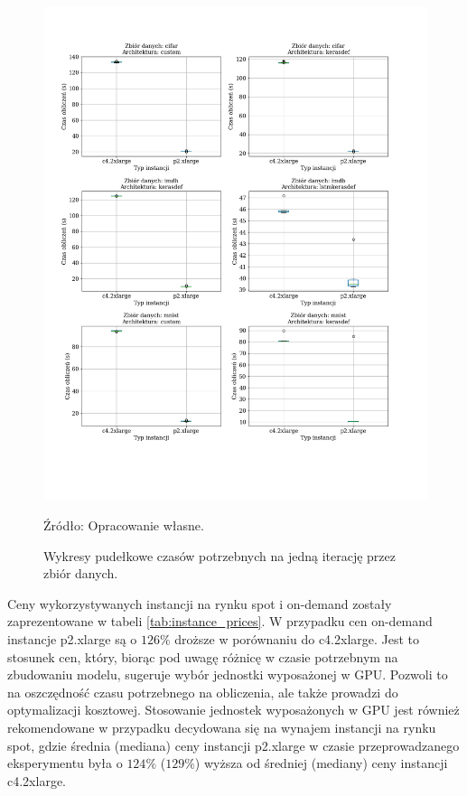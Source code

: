 \documentclass[12pt,a4paper,twoside]{article}
\newcommand{\source}[1]{\caption*{\hfill Źródło: {#1}} }
\begin{document}
\begin{figure}[h]
  \centering
\includegraphics[scale=0.5]{../obrazy/fig:experiment_results.png}
\caption{Wykresy pudełkowe czasów potrzebnych na jedną iterację przez zbiór danych.\label{fig:experiment_results}}
\source{Opracowanie własne.}
\end{figure}

Ceny wykorzystywanych instancji na rynku spot i on-demand zostały zaprezentowane w tabeli \ref{tab:instance_prices}. W przypadku cen on-demand instancje p2.xlarge są o $126\%$ droższe w porównaniu do c4.2xlarge. Jest to stosunek cen, który, biorąc pod uwagę różnicę w czasie potrzebnym na zbudowaniu modelu, sugeruje wybór jednostki wyposażonej w GPU. Pozwoli to na oszczędność czasu potrzebnego na obliczenia, ale także prowadzi do optymalizacji kosztowej.
Stosowanie jednostek wyposażonych w GPU jest również rekomendowane w przypadku decydowana się na wynajem instancji na rynku spot, gdzie średnia (mediana) ceny instancji p2.xlarge w czasie przeprowadzanego eksperymentu była o $124\%$ ($129\%$) wyższa od średniej (mediany) ceny instancji c4.2xlarge.
\end{document}
